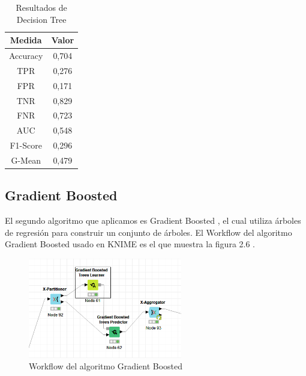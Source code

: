	\begin{table}[htbp]
		\begin{center}
			\begin{tabular}{|c|c|}
				\hline
				Medida & Valor \\
				\hline \hline
				Accuracy & 0,704 \\
				\hline
				TPR &  0,276 \\
				\hline
				FPR &  0,171 \\
				\hline
				TNR &  0,829 \\
				\hline
				FNR &  0,723 \\
				\hline
				AUC &  0,548 \\
				\hline
				F1-Score & 0,296 \\
				\hline	
				G-Mean & 0,479 \\
				\hline
			\end{tabular}
			\caption{Resultados de Decision Tree}
			\label{tabla:sencilla}
		\end{center}
	\end{table}


	\subsection{Gradient Boosted}

	El segundo algoritmo que aplicamos es Gradient Boosted \cite{Wikipedia3} , el cual utiliza árboles 
	de regresión para construir un conjunto de árboles. El Workflow del algoritmo Gradient Boosted usado en KNIME 
	es el que muestra la figura 2.6 . \\

	\begin{figure}[htb]
		\centering
		\includegraphics[width=0.6\textwidth]{./imagenes/10}
		\caption{Workflow del algoritmo Gradient Boosted} \label{fig:10}
	\end{figure}

